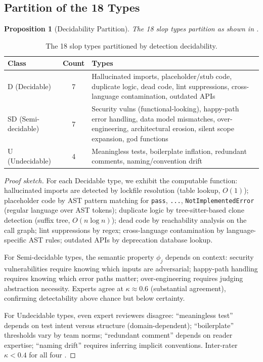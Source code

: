 \documentclass[11pt, a4paper, copyright]{googledeepmind}
\newtheorem{proposition}{Proposition}[section]
\begin{document}
\subsection{Partition of the 18 Types}

\begin{proposition}[Decidability Partition]
\label{prop:partition}
The 18 slop types partition as shown in .
\end{proposition}

\begin{table}[htbp]
\centering
\caption{The 18 slop types partitioned by detection decidability.}
\label{tab:partition}
\small
\begin{tabularx}{\textwidth}{l c X}
\toprule
\textbf{Class} & \textbf{Count} & \textbf{Types} \\
\midrule
D (Decidable) & 7 & Hallucinated imports, placeholder/stub code, duplicate logic, dead code, lint suppressions, cross-language contamination, outdated APIs \\
\addlinespace
SD (Semi-decidable) & 7 & Security vulns (functional-looking), happy-path error handling, data model mismatches, over-engineering, architectural erosion, silent scope expansion, god functions \\
\addlinespace
U (Undecidable) & 4 & Meaningless tests, boilerplate inflation, redundant comments, naming/convention drift \\
\bottomrule
\end{tabularx}
\end{table}

\begin{proof}[Proof sketch]
For each Decidable type, we exhibit the computable function: hallucinated imports are detected by lockfile resolution (table lookup, $O(1)$); placeholder code by AST pattern matching for \texttt{pass}, \texttt{...}, \texttt{NotImplementedError} (regular language over AST tokens); duplicate logic by tree-sitter-based clone detection (suffix tree, $O(n \log n)$); dead code by reachability analysis on the call graph; lint suppressions by regex; cross-language contamination by language-specific AST rules; outdated APIs by deprecation database lookup.

For Semi-decidable types, the semantic property $\phi_j$ depends on context: security vulnerabilities require knowing which inputs are adversarial; happy-path handling requires knowing which error paths matter; over-engineering requires judging abstraction necessity. Experts agree at $\kappa \approx 0.6$ (substantial agreement), confirming detectability above chance but below certainty.

For Undecidable types, even expert reviewers disagree: ``meaningless test'' depends on test intent versus structure (domain-dependent); ``boilerplate'' thresholds vary by team norms; ``redundant comment'' depends on reader expertise; ``naming drift'' requires inferring implicit conventions. Inter-rater $\kappa < 0.4$ for all four \citep{llmjudgetrust2024}.
\end{proof}
\end{document}
